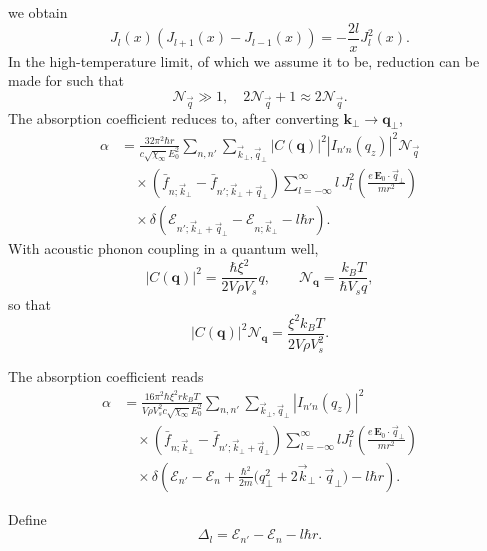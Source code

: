 \documentclass[%
 reprint,
 amsmath,amssymb,
 aps,
]{revtex4-2}
\begin{document}
we obtain
\begin{equation}
J_l(x)\left(J_{l+1}(x)-J_{l-1}(x)\right)
=
-\frac{2l}{x} J_l^2(x).
\end{equation}
%
In the high-temperature limit, of which we assume it to be, reduction can be made for such that
\begin{equation}
\mathcal{N}_{\vec q} \gg 1,
\quad
2\mathcal{N}_{\vec q}+1 \approx 2\mathcal{N}_{\vec q}.
\end{equation}
%
The absorption coefficient reduces to, after converting $\mathbf{k}_{\perp}\to\mathbf{q}_{\perp}$,
\begin{align}
\alpha
&=
\frac{32 \pi^2 \hbar r}{c \sqrt{\chi_\infty} E_0^2}
\sum_{n,n'}
\sum_{\vec{k}_\bot,\vec{q}_\bot}
|C(\mathbf q)|^2
|I_{n'n}(q_z)|^2
\mathcal{N}_{\vec q}
\nonumber\\
&\quad\times
\left(
\bar f_{n; \vec{k}_\bot}
-
\bar f_{n'; \vec{k}_\bot+\vec{q}_\bot}
\right)
\sum_{l=-\infty}^{\infty}
l\,
J_l^2\!\left(
\frac{e\,\mathbf{E}_0\!\cdot\!\vec{q}_\bot}{m r^2}
\right)
\nonumber\\
&\quad\times
\delta\!\left(
\mathcal{E}_{n'; \vec{k}_\bot+\vec{q}_\bot}
-
\mathcal{E}_{n; \vec{k}_\bot}
-
l\hbar r
\right).
\end{align}
With acoustic phonon coupling in a quantum well,
\begin{equation}
|C(\mathbf q)|^2 = \frac{\hbar \xi^2}{2 V \rho V_s} q,
\qquad
\mathcal N_{\mathbf q} = \frac{k_B T}{\hbar V_s q},
\end{equation}
so that
\begin{equation}
|C(\mathbf q)|^2 \mathcal N_{\mathbf q}
=
\frac{\xi^2 k_B T}{2 V \rho V_s^2}.
\end{equation}

The absorption coefficient reads
\begin{align}
\alpha
&=
\frac{16 \pi^2 \hbar \xi^2 r k_B T}
{V \rho V_s^2 c \sqrt{\chi_\infty} E_0^2}
\sum_{n,n'}
\sum_{\vec{k}_\bot,\vec{q}_\bot}
|I_{n'n}(q_z)|^2
\nonumber\\
&\quad\times
\left(
\bar f_{n;\vec{k}_\bot}
-
\bar f_{n';\vec{k}_\bot+\vec{q}_\bot}
\right)
\sum_{l=-\infty}^{\infty}
l
J_l^2\!\left(
\frac{e\,\mathbf E_0\!\cdot\!\vec q_\bot}{m r^2}
\right)
\nonumber\\
&\quad\times
\delta\!\left(
\mathcal E_{n'}-\mathcal E_n
+
\frac{\hbar^2}{2m}
\big(q_\bot^2+2\vec k_\bot\!\cdot\!\vec q_\bot\big)
-
l\hbar r
\right).
\end{align}

Define
\begin{equation}
\Delta_l
=
\mathcal E_{n'}-\mathcal E_n-l\hbar r.
\end{equation}
\end{document}
